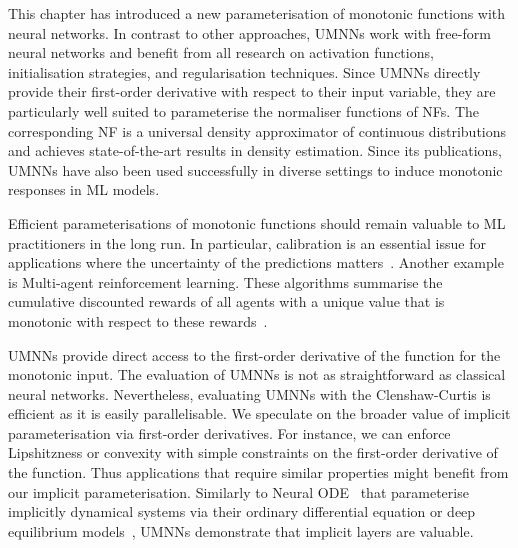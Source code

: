 This chapter has introduced a new parameterisation of monotonic functions with neural networks. In contrast to other approaches, UMNNs work with free-form neural networks and benefit from all research on activation functions, initialisation strategies, and regularisation techniques. Since UMNNs directly provide their first-order derivative with respect to their input variable, they are particularly well suited to parameterise the normaliser functions of NFs. The corresponding NF is a universal density approximator of continuous distributions and achieves state-of-the-art results in density estimation. Since its publications, UMNNs have also been used successfully in diverse settings to induce monotonic responses in ML models.

Efficient parameterisations of monotonic functions should remain valuable to ML practitioners in the long run. In particular, calibration is an essential issue for applications where the uncertainty of the predictions matters~\citep{minderer2021revisiting, guo2017calibration, cranmer2015approximating}. Another example is Multi-agent reinforcement learning. These algorithms summarise the cumulative discounted rewards of all agents with a unique value that is monotonic with respect to these rewards~\citep{rashid2018qmix, leroy2020qvmix}.

UMNNs provide direct access to the first-order derivative of the function for the monotonic input. The evaluation of UMNNs is not as straightforward as classical neural networks. Nevertheless, evaluating UMNNs with the Clenshaw-Curtis is efficient as it is easily parallelisable. We speculate on the broader value of implicit parameterisation via first-order derivatives. For instance, we can enforce Lipshitzness or convexity with simple constraints on the first-order derivative of the function. Thus applications that require similar properties might benefit from our implicit parameterisation. Similarly to Neural ODE~\citep{chen_neural_2018} that parameterise implicitly dynamical systems via their ordinary differential equation or deep equilibrium models~\citep{bai2019deep}, UMNNs demonstrate that implicit layers are valuable.
